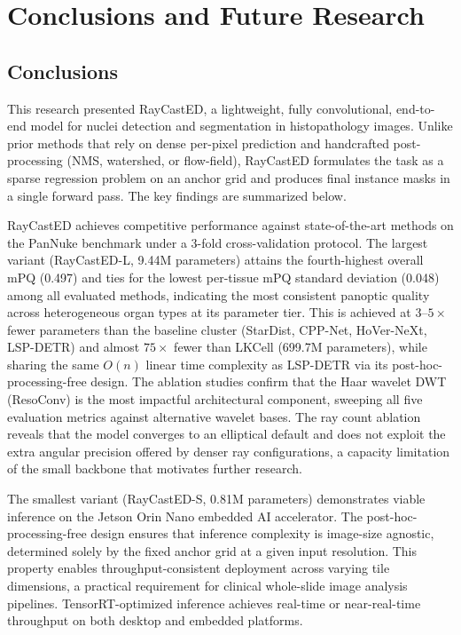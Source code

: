 \chapter{Conclusions and Future Research}

\section{Conclusions}

This research presented RayCastED, a lightweight, fully convolutional, end-to-end model for nuclei detection and segmentation
in histopathology images. Unlike prior methods that rely on dense per-pixel prediction and handcrafted post-processing
(NMS, watershed, or flow-field), RayCastED formulates the task as a sparse regression problem on an anchor grid and produces
final instance masks in a single forward pass. The key findings are summarized below.

RayCastED achieves competitive performance against state-of-the-art methods on the PanNuke benchmark under a 3-fold
cross-validation protocol. The largest variant (RayCastED-L, 9.44M parameters) attains the fourth-highest overall mPQ
(0.497) and ties for the lowest per-tissue mPQ standard deviation (0.048) among all evaluated methods, indicating the
most consistent panoptic quality across heterogeneous organ types at its parameter tier. This is achieved at $3$--$5\times$
fewer parameters than the baseline cluster (StarDist, CPP-Net, HoVer-NeXt, LSP-DETR) and almost $75\times$ fewer than
LKCell (699.7M parameters), while sharing the same $O(n)$ linear time complexity as LSP-DETR via its
post-hoc-processing-free design. The ablation studies confirm that the Haar wavelet DWT (ResoConv) is the most impactful
architectural component, sweeping all five evaluation metrics against alternative wavelet bases. The ray count ablation
reveals that the model converges to an elliptical default and does not exploit the extra angular precision offered by
denser ray configurations, a capacity limitation of the small backbone that motivates further research.

The smallest variant (RayCastED-S, 0.81M parameters) demonstrates viable inference on the Jetson Orin Nano embedded AI
accelerator. The post-hoc-processing-free design ensures that inference complexity is image-size agnostic, determined
solely by the fixed anchor grid at a given input resolution. This property enables throughput-consistent deployment
across varying tile dimensions, a practical requirement for clinical whole-slide image analysis pipelines.
TensorRT-optimized inference achieves real-time or near-real-time throughput on both desktop and embedded platforms.

